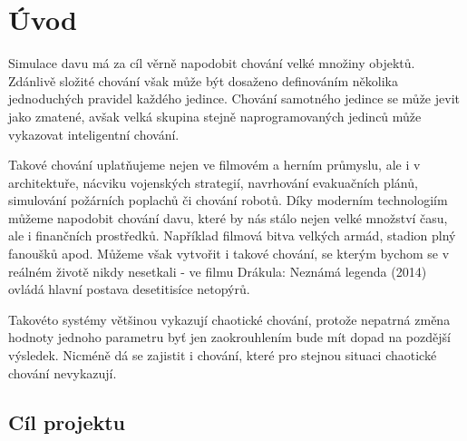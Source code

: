 \section{Úvod}
Simulace davu má za cíl věrně napodobit chování velké množiny objektů. Zdánlivě složité chování však může být dosaženo definováním několika jednoduchých pravidel každého jedince. Chování samotného jedince se může jevit jako zmatené, avšak velká skupina stejně naprogramovaných jedinců může vykazovat inteligentní chování. 
\par
Takové chování uplatňujeme nejen ve filmovém a herním průmyslu, ale i v architektuře, nácviku vojenských strategií, navrhování evakuačních plánů, simulování požárních poplachů či chování robotů. Díky moderním technologiím můžeme napodobit chování davu, které by nás stálo nejen velké množství času, ale i finančních prostředků. Například filmová bitva velkých armád, stadion plný fanoušků apod. Můžeme však vytvořit i takové chování, se kterým bychom se v reálném životě nikdy nesetkali - ve filmu Drákula: Neznámá legenda (2014) ovládá hlavní postava desetitisíce netopýrů. 
\par 
Takovéto systémy většinou vykazují chaotické chování, protože nepatrná změna hodnoty jednoho parametru byť jen zaokrouhlením bude mít dopad na pozdější výsledek. Nicméně dá se zajistit i chování, které pro stejnou situaci chaotické chování nevykazují. 
\subsection{Cíl projektu}